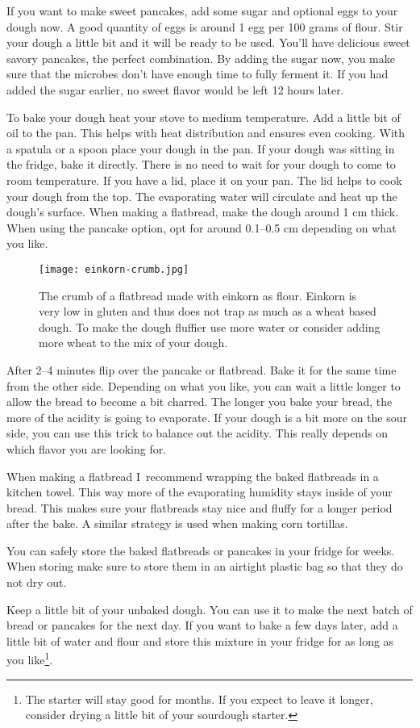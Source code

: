 If you want to make sweet pancakes, add some sugar and optional eggs to your dough
now. A good quantity of eggs is around 1 egg per 100 grams of flour.
Stir your dough a little bit and it will be ready to be used. You'll
have delicious sweet savory pancakes, the perfect combination. By
adding the sugar now, you make sure that the microbes don't have
enough time to fully ferment it. If you had added the sugar
earlier, no sweet flavor would be left 12 hours later.

To bake your dough heat your stove to medium temperature. Add a little bit of
oil to the pan. This helps with heat distribution and ensures even cooking.
With a spatula or a spoon place your dough in the pan. If your dough
was sitting in the fridge, bake it directly. There is no need to wait for your
dough to come to room temperature. If you have a lid,
place it on your pan. The lid helps to cook your dough from the top.
The evaporating water will circulate and heat up the dough's surface. When
making a flatbread, make the dough around 1 cm thick. When using the pancake
option, opt for around 0.1--0.5 cm depending on what you like.

\begin{figure}[htb!]
  \texttt{[image: einkorn-crumb.jpg]}
  \centering
  \caption{The crumb of a flatbread made with einkorn as flour. Einkorn
  is very low in gluten and thus does not trap as much  as a wheat based
  dough. To make the dough fluffier use more water or consider adding
  more wheat to the mix of your dough.}
\end{figure}

After 2--4 minutes flip over the pancake or flatbread. Bake it for the same
time from the other side. Depending on what you like, you can wait a little
longer to allow the bread to become a bit charred. The longer you
bake your bread, the more of the acidity is going to evaporate. If your
dough is a bit more on the sour side, you can use this trick to balance
out the acidity. This really depends on which flavor you are looking for.

When making a flatbread I~recommend wrapping the baked flatbreads
in a kitchen towel. This way more of the evaporating humidity
stays inside of your bread. This makes sure your flatbreads stay
nice and fluffy for a longer period after the bake. A similar strategy is
used when making corn tortillas.

You can safely store the baked flatbreads or pancakes in your fridge
for weeks. When storing make sure to store them in an airtight plastic bag so that
they do not dry out.

Keep a little bit of your unbaked dough. You can use it to make the next
batch of bread or pancakes for the next day. If you want to bake a few days later, add
a little bit of water and flour and store this mixture in your fridge
for as long as you like\footnote{The starter will stay good for months. If you expect to
leave it longer, consider drying a little bit of your sourdough starter.}.
